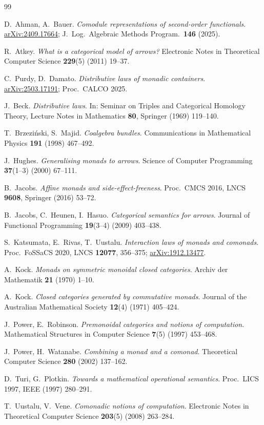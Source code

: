 \documentclass[11pt]{amsart}
\theoremstyle{plain}
\theoremstyle{definition}
\theoremstyle{remark}
\begin{document}
\begin{thebibliography}{99}

 D.~Ahman, A.~Bauer.
\emph{Comodule representations of second-order functionals}.
\href{https://arxiv.org/abs/2409.17664}{arXiv:2409.17664};
J.\ Log.\ Algebraic Methods Program.\ \textbf{146} (2025).

 R.~Atkey.
\emph{What is a categorical model of arrows?}
Electronic Notes in Theoretical Computer Science \textbf{229}(5) (2011) 19--37.

 C.~Purdy, D.~Damato.
\emph{Distributive laws of monadic containers}.
\href{https://arxiv.org/abs/2503.17191}{arXiv:2503.17191}; Proc.\ CALCO 2025.

 J.~Beck.
\emph{Distributive laws}.
In: Seminar on Triples and Categorical Homology Theory, Lecture Notes in Mathematics
\textbf{80}, Springer (1969) 119--140.

 T.~Brzezi\'nski, S.~Majid.
\emph{Coalgebra bundles}.
Communications in Mathematical Physics \textbf{191} (1998) 467--492.

 J.~Hughes.
\emph{Generalising monads to arrows}.
Science of Computer Programming \textbf{37}(1--3) (2000) 67--111.

 B.~Jacobs.
\emph{Affine monads and side-effect-freeness}.
Proc.\ CMCS 2016, LNCS \textbf{9608}, Springer (2016) 53--72.

 B.~Jacobs, C.~Heunen, I.~Hasuo.
\emph{Categorical semantics for arrows}.
Journal of Functional Programming \textbf{19}(3--4) (2009) 403--438.

 S.~Katsumata, E.~Rivas, T.~Uustalu.
\emph{Interaction laws of monads and comonads}.
Proc.\ FoSSaCS 2020, LNCS \textbf{12077}, 356--375;
\href{https://arxiv.org/abs/1912.13477}{arXiv:1912.13477}.

 A.~Kock.
\emph{Monads on symmetric monoidal closed categories}.
Archiv der Mathematik \textbf{21} (1970) 1--10.

 A.~Kock.
\emph{Closed categories generated by commutative monads}.
Journal of the Australian Mathematical Society \textbf{12}(4) (1971) 405--424.

 J.~Power, E.~Robinson.
\emph{Premonoidal categories and notions of computation}.
Mathematical Structures in Computer Science \textbf{7}(5) (1997) 453--468.

 J.~Power, H.~Watanabe.
\emph{Combining a monad and a comonad}.
Theoretical Computer Science \textbf{280} (2002) 137--162.

 D.~Turi, G.~Plotkin.
\emph{Towards a mathematical operational semantics}.
Proc.\ LICS 1997, IEEE (1997) 280--291.

 T.~Uustalu, V.~Vene.
\emph{Comonadic notions of computation}.
Electronic Notes in Theoretical Computer Science \textbf{203}(5) (2008) 263--284.

\end{thebibliography}
\end{document}
